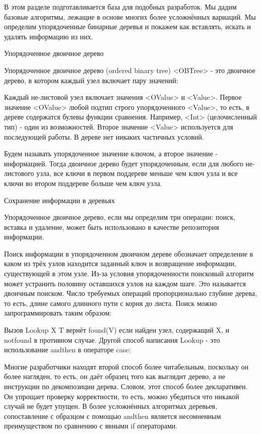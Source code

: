 В этом разделе подготавливается база для подобных разработок. Мы дадим базовые алгоритмы, лежащие в основе многих более усложнённых вариаций. Мы определим упорядоченные бинарные деревья и покажем как вставлять, искать и удалять информацию из них.

Упорядоченное двоичное дерево

Упорядоченное двоичное дерево (ordered binary tree) <OBTree> - это двоичное дерево, в котором каждый узел включает пару значений:

Каждый не-листовой узел включает значения <OValue> и <Value>. Первое значение <OValue> любой подтип строго упорядоченного <Value>, то есть, в дереве содержатся булевы функции сравнения. Например, <Int> (целочисленный тип) - один из возможностей. Второе значение <Value> используется для последующей работы. В дереве нет никаких частичных условий.

Будем называть упорядоченное значение ключом, а второе значение - информацией. Тогда двоичное дерево будет упорядоченным, если для любого не-листового узла, все ключи в первом поддереве меньше чем ключ узла и все ключи во втором поддереве больше чем ключ узла.

Сохранение информации в деревьях

Упорядоченное двоичное дерево, если мы определим три операции: поиск, вставка и удаление, может быть использовано в качестве репозитория информации.

Поиск информации в упорядоченном двоичном дереве обозначает определение в каком из трёх узлов находится заданный ключ и возвращение информации, существующей в этом узле. Из-за условия упорядоченности поисковый алгоритм может устранить половину оставшихся узлов на каждом шаге. Это называется двоичным поиском. Число требуемых операций пропорционально глубине дерева, то есть, длине самого длинного пути с корня до листа. Поиск можно запрограммировать таким образом:

Вызов {Lookup X T} вернёт found(V) если найден узел, содержащий X, и notfound в противном случае. Другой способ написания Lookup - это использование andthen в операторе case:

Многие разработчики находят второй способ более читабельным, поскольку он более нагляден, то есть, он даёт образец того как выглядит дерево, а не инструкции по декомпозиции дерева. Словом, этот способ более декларативен. Он упрощает проверку корректности, то есть, можно убедиться что никакой случай не будет упущен. В более усложнённых алгоритмах деревьев, сопоставление с образцом с помощью andthen является несомненным преимуществом по сравнению с явными if операторами.

